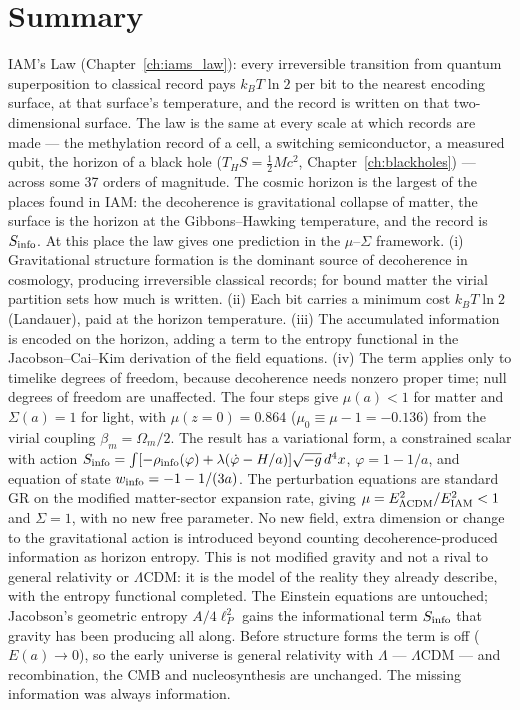 \section*{Summary}
IAM's Law (Chapter~\ref{ch:iams_law}): every irreversible transition from quantum superposition to classical record pays $k_BT\ln2$ per bit
to the nearest encoding surface, at that surface's temperature, and the record is written on that two-dimensional surface. The law is the same at
every scale at which records are made --- the methylation record of a cell, a switching semiconductor, a measured qubit, the horizon of a black hole
($T_HS=\tfrac12Mc^2$, Chapter~\ref{ch:blackholes}) --- across some 37 orders of magnitude. The cosmic horizon is the largest of the places found in IAM: the decoherence is gravitational
collapse of matter, the surface is the horizon at the Gibbons--Hawking temperature, and the record is $S_{\rm info}$. At this place the law gives one
prediction in the $\mu$--$\Sigma$ framework.
(i) Gravitational structure formation is the dominant source of decoherence in cosmology, producing irreversible classical records; for bound matter the virial
partition sets how much is written. (ii) Each bit carries a minimum cost $k_BT\ln2$ (Landauer), paid at the horizon temperature. (iii) The accumulated information is
encoded on the horizon, adding a term to the entropy functional in the Jacobson--Cai--Kim derivation of the field equations. (iv) The term applies only
to timelike degrees of freedom, because decoherence needs nonzero proper time; null degrees of freedom are unaffected.
The four steps give $\mu(a)<1$ for matter and $\Sigma(a)=1$ for light, with $\mu(z{=}0)=0.864$ ($\mu_0\equiv\mu-1=-0.136$) from the virial coupling
$\beta_m=\Omega_m/2$. The result has a variational form, a constrained scalar with action $S_{\rm info}=\int[-\rho_{\rm info}(\varphi)+\lambda(\dot\varphi-H/a)]\sqrt{-g}\,d^4x$,
$\varphi=1-1/a$, and equation of state $w_{\rm info}=-1-1/(3a)$. The perturbation equations are standard GR on the modified matter-sector expansion
rate, giving $\mu=E^2_{\Lambda\rm CDM}/E^2_{\rm IAM}<1$ and $\Sigma=1$, with no new free parameter. No new field, extra dimension or change to the
gravitational action is introduced beyond counting decoherence-produced information as horizon entropy. This is not modified gravity and not a
rival to general relativity or $\Lambda$CDM: it is the model of the reality they already describe, with the entropy functional
completed. The Einstein equations are untouched; Jacobson's geometric entropy
$A/4\ell_P^2$ gains the informational term $S_{\rm info}$ that gravity has been producing all along. Before structure forms the term is off
($E(a)\to0$), so the early universe is general relativity with $\Lambda$ --- $\Lambda$CDM --- and recombination, the CMB and nucleosynthesis are
unchanged. The missing information was always information.

